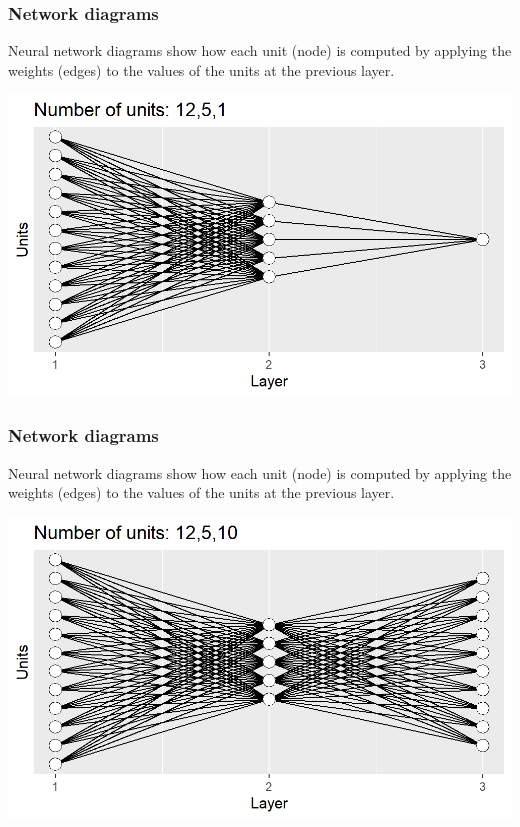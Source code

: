 \documentclass{beamer}
\begin{document}
\begin{frame}
  \frametitle{Network diagrams}
  Neural network
  diagrams show how each unit (node) is computed by applying the
  weights (edges) to the values of the units at the previous layer.

\includegraphics[width=\textwidth]{figure-architecture-oneOut}
\end{frame}

\begin{frame}
  \frametitle{Network diagrams}
  Neural network
  diagrams show how each unit (node) is computed by applying the
  weights (edges) to the values of the units at the previous layer.

\includegraphics[width=\textwidth]{figure-architecture-tenOut}
\end{frame}
\end{document}

